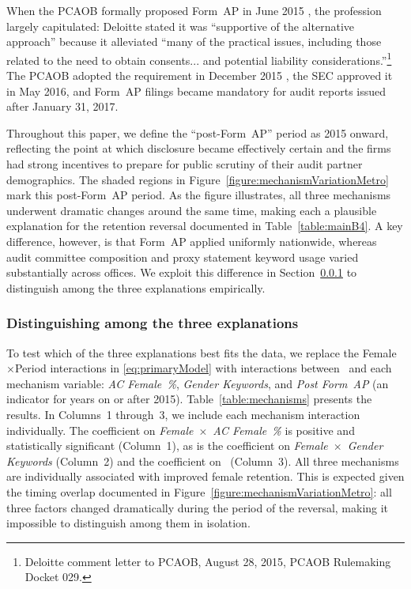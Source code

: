 \documentclass[11pt]{article}
\begin{document}
            When the PCAOB formally proposed Form~AP in June 2015 \parencite{pcaobSupplementalRequest2015}, the profession largely capitulated: Deloitte stated it was ``supportive of the alternative approach'' because it alleviated ``many of the practical issues, including those related to the need to obtain consents... and potential liability considerations.''\footnote{Deloitte comment letter to PCAOB, August 28, 2015, PCAOB Rulemaking Docket 029.} The PCAOB adopted the requirement in December 2015 \parencite{pcaobAdoptionFormAP2015}, the SEC approved it in May 2016, and Form~AP filings became mandatory for audit reports issued after January 31, 2017. 
            
            Throughout this paper, we define the ``post-Form~AP'' period as 2015 onward, reflecting the point at which disclosure became effectively certain and the firms had strong incentives to prepare for public scrutiny of their audit partner demographics. The shaded regions in Figure~\ref{figure:mechanismVariationMetro} mark this post-Form~AP period. As the figure illustrates, all three mechanisms underwent dramatic changes around the same time, making each a plausible explanation for the retention reversal documented in Table~\ref{table:mainB4}. A key difference, however, is that Form~AP applied uniformly nationwide, whereas audit committee composition and proxy statement keyword usage varied substantially across offices. We exploit this difference in Section~\ref{section:mechanismVariables} to distinguish among the three explanations empirically.
        

        \subsubsection{Distinguishing among the three explanations}\label{section:mechanismVariables}

            To test which of the three explanations best fits the data, we replace the Female$\times$Period interactions in \ref{eq:primaryModel} with interactions between \FEMALE\ and each mechanism variable: \textit{AC Female~\%}, \textit{Gender Keywords}, and \textit{Post Form~AP} (an indicator for years on or after 2015). Table~\ref{table:mechanisms} presents the results. In Columns~1 through~3, we include each mechanism interaction individually. The coefficient on \textit{Female}~$\times$~\textit{AC Female~\%} is positive and statistically significant (Column~1), as is the coefficient on \textit{Female}~$\times$~\textit{Gender Keywords} (Column~2) and the coefficient on \FEMALExPOSTFORMAP\ (Column~3). All three mechanisms are individually associated with improved female retention. This is expected given the timing overlap documented in Figure~\ref{figure:mechanismVariationMetro}: all three factors changed dramatically during the period of the reversal, making it impossible to distinguish among them in isolation.
\end{document}
